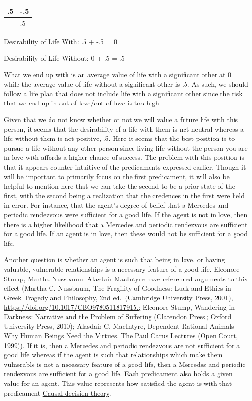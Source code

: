 \documentclass[
  letterpaper,
  DIV=11,
  numbers=noendperiod]{scrartcl}
\newcounter{none} %
\begin{document}
{\def\LTcaptype{none} %
\begin{longtable}[]{@{}ll@{}}
\toprule\noalign{}
.5 & -.5 \\
\midrule\noalign{}
\endhead
\bottomrule\noalign{}
\endlastfoot
0 & .5 \\
\end{longtable}
}

Desirability of Life With: .5 + -.5 = 0

Desirability of Life Without: 0 + .5 = .5

What we end up with is an average value of life with a significant other
at 0 while the average value of life without a significant other is .5.
As such, we should follow a life plan that does not include life with a
significant other since the risk that we end up in out of love/out of
love is too high.

Given that we do not know whether or not we will value a future life
with this person, it seems that the desirability of a life with them is
net neutral whereas a life without them is net positive, .5. Here it
seems that the best position is to pursue a life without any other
person since living life without the person you are in love with affords
a higher chance of success. The problem with this position is that it
appears counter intuitive of the predicaments expressed earlier. Though
it will be important to primarily focus on the first predicament, it
will also be helpful to mention here that we can take the second to be a
prior state of the first, with the second being a realization that the
credences in the first were held in error. For instance, that the
agent's degree of belief that a Mercedes and periodic rendezvous were
sufficient for a good life. If the agent is not in love, then there is a
higher likelihood that a Mercedes and periodic rendezvous are sufficient
for a good life. If an agent is in love, then these would not be
sufficient for a good life.

Another question is whether an agent is such that being in love, or
having valuable, vulnerable relationships is a necessary feature of a
good life. Eleonore Stump, Martha Nussbaum, Alasdair MacIntyre have
referenced arguments to this effect (Martha C. Nussbaum, The Fragility
of Goodness: Luck and Ethics in Greek Tragedy and Philosophy, 2nd
ed.~(Cambridge University Press, 2001),
\url{https://doi.org/10.1017/CBO9780511817915.;} Eleonore Stump,
Wandering in Darkness: Narrative and the Problem of Suffering (Clarendon
Press\,; Oxford University Press, 2010); Alasdair C. MacIntyre,
Dependent Rational Animals: Why Human Beings Need the Virtues, The Paul
Carus Lectures (Open Court, 1999)). If it is, then a Mercedes and
periodic rendezvous are not sufficient for a good life whereas if the
agent is such that relationships which make them vulnerable is not a
necessary feature of a good life, then a Mercedes and periodic
rendezvous are sufficient for a good life. Each predicament also holds a
given value for an agent. This value represents how satisfied the agent
is with that predicament
\href{https://app.notion.com/p/Causal-decision-theory-3728935bcf8a811699c4ee0903a301ba?pvs=21}{Causal
decision theory}.
\end{document}
